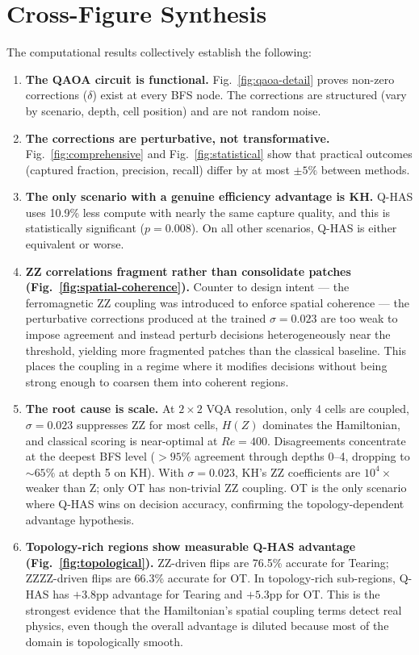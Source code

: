 \documentclass[12pt, a4paper, oneside]{report}
\begin{document}
\section{Cross-Figure Synthesis}

The computational results collectively establish the following:

\begin{enumerate}
    \item \textbf{The QAOA circuit is functional.} Fig.~\ref{fig:qaoa-detail} proves non-zero corrections ($\delta$) exist at every BFS node. The corrections are structured (vary by scenario, depth, cell position) and are not random noise.

    \item \textbf{The corrections are perturbative, not transformative.} Fig.~\ref{fig:comprehensive} and Fig.~\ref{fig:statistical} show that practical outcomes (captured fraction, precision, recall) differ by at most $\pm 5\%$ between methods.

    \item \textbf{The only scenario with a genuine efficiency advantage is KH.} Q-HAS uses 10.9\% less compute with nearly the same capture quality, and this is statistically significant ($p = 0.008$). On all other scenarios, Q-HAS is either equivalent or worse.

    \item \textbf{ZZ correlations fragment rather than consolidate patches (Fig.~\ref{fig:spatial-coherence}).} Counter to design intent --- the ferromagnetic ZZ coupling was introduced to enforce spatial coherence --- the perturbative corrections produced at the trained $\sigma = 0.023$ are too weak to impose agreement and instead perturb decisions heterogeneously near the threshold, yielding more fragmented patches than the classical baseline. This places the coupling in a regime where it modifies decisions without being strong enough to coarsen them into coherent regions.

    \item \textbf{The root cause is scale.} At $2\times 2$ VQA resolution, only 4 cells are coupled, $\sigma = 0.023$ suppresses ZZ for most cells, $H(Z)$ dominates the Hamiltonian, and classical scoring is near-optimal at $Re = 400$. Disagreements concentrate at the deepest BFS level ($>95\%$ agreement through depths 0--4, dropping to $\sim 65\%$ at depth 5 on KH). With $\sigma = 0.023$, KH's ZZ coefficients are $10^4\times$ weaker than Z; only OT has non-trivial ZZ coupling. OT is the only scenario where Q-HAS wins on decision accuracy, confirming the topology-dependent advantage hypothesis.

    \item \textbf{Topology-rich regions show measurable Q-HAS advantage (Fig.~\ref{fig:topological}).} ZZ-driven flips are 76.5\% accurate for Tearing; ZZZZ-driven flips are 66.3\% accurate for OT. In topology-rich sub-regions, Q-HAS has $+3.8$pp advantage for Tearing and $+5.3$pp for OT. This is the strongest evidence that the Hamiltonian's spatial coupling terms detect real physics, even though the overall advantage is diluted because most of the domain is topologically smooth.
\end{enumerate}
\end{document}
